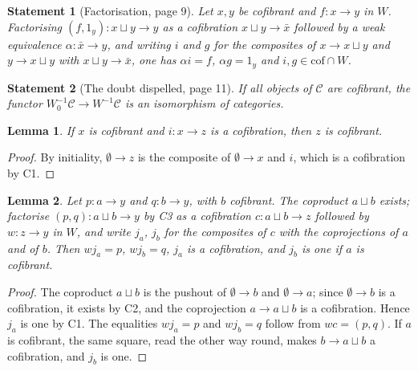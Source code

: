 \documentclass[11pt]{article}
\theoremstyle{plain}
\newtheorem*{enonce}{Statement}
\newtheorem{lemme}{Lemma}[section]
\theoremstyle{definition}
\theoremstyle{remark}
\begin{document}
\begin{enonce}[Factorisation, page 9]
Let $x, y$ be cofibrant and $f : x \to y$ in $W$. Factorising $(f, 1_y) : x \sqcup y \to y$ as a cofibration $x \sqcup y \to \bar x$ followed by a weak equivalence $\alpha : \bar x \to y$, and writing $i$ and $g$ for the composites of $x \to x \sqcup y$ and $y \to x \sqcup y$ with $x \sqcup y \to \bar x$, one has $\alpha i = f$, $\alpha g = 1_y$ and $i, g \in \mathrm{cof} \cap W$.
\end{enonce}

\begin{enonce}[The doubt dispelled, page 11]
If all objects of $\mathcal C$ are cofibrant, the functor $W_0^{-1}\mathcal C \to W^{-1}\mathcal C$ is an isomorphism of categories.
\end{enonce}

\begin{lemme}\label{lem:106-cof}
If $x$ is cofibrant and $i : x \to z$ is a cofibration, then $z$ is cofibrant.
\end{lemme}

\begin{proof}
By initiality, $\emptyset \to z$ is the composite of $\emptyset \to x$ and $i$, which is a cofibration by C1.
\end{proof}

\begin{lemme}\label{lem:106-somme}
Let $p : a \to y$ and $q : b \to y$, with $b$ cofibrant. The coproduct $a \sqcup b$ exists; factorise $(p, q) : a \sqcup b \to y$ by C3 as a cofibration $c : a \sqcup b \to z$ followed by $w : z \to y$ in $W$, and write $j_a$, $j_b$ for the composites of $c$ with the coprojections of $a$ and of $b$. Then $w j_a = p$, $w j_b = q$, $j_a$ is a cofibration, and $j_b$ is one if $a$ is cofibrant.
\end{lemme}

\begin{proof}
The coproduct $a \sqcup b$ is the pushout of $\emptyset \to b$ and $\emptyset \to a$; since $\emptyset \to b$ is a cofibration, it exists by C2, and the coprojection $a \to a \sqcup b$ is a cofibration. Hence $j_a$ is one by C1. The equalities $w j_a = p$ and $w j_b = q$ follow from $wc = (p, q)$. If $a$ is cofibrant, the same square, read the other way round, makes $b \to a \sqcup b$ a cofibration, and $j_b$ is one.
\end{proof}
\end{document}
